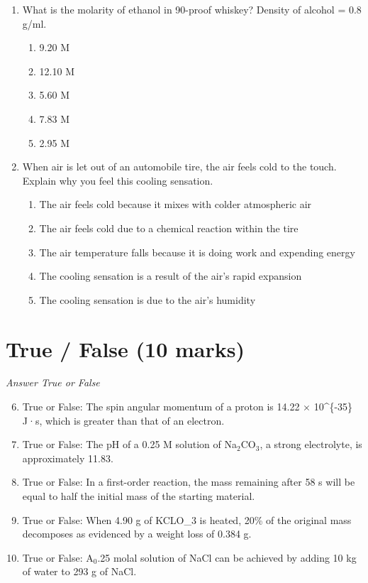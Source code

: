 \documentclass[12pt]{article}
\begin{document}
\begin{enumerate}[label=\arabic*.]
\item What is the molarity of ethanol in 90-proof whiskey? Density of alcohol = 0.8 g/ml.
\begin{enumerate}[label=(\alph*)]
    \item 9.20 M
    \item 12.10 M
    \item 5.60 M
    \item 7.83 M
    \item 2.95 M
\end{enumerate}
\item When air is let out of an automobile tire, the air feels cold to the touch. Explain why you feel this cooling sensation.
\begin{enumerate}[label=(\alph*)]
    \item The air feels cold because it mixes with colder atmospheric air
    \item The air feels cold due to a chemical reaction within the tire
    \item The air temperature falls because it is doing work and expending energy
    \item The cooling sensation is a result of the air's rapid expansion
    \item The cooling sensation is due to the air's humidity
\end{enumerate}
\end{enumerate}

\section*{True / False (10 marks)}
\textit{Answer True or False}
\begin{enumerate}[label=\arabic*.]
\setcounter{enumi}{5}
\item True or False: The spin angular momentum of a proton is 14.22 \ensuremath{\times} 10^\{-35\} J·s, which is greater than that of an electron.
\item True or False: The pH of a 0.25 M solution of Na$_{2}$CO$_{3}$, a strong electrolyte, is approximately 11.83.
\item True or False: In a first-order reaction, the mass remaining after 58 s will be equal to half the initial mass of the starting material.
\item True or False: When 4.90 g of KCLO\_3 is heated, 20\% of the original mass decomposes as evidenced by a weight loss of 0.384 g.
\item True or False: A$_{0}$.25 molal solution of NaCl can be achieved by adding 10 kg of water to 293 g of NaCl.
\end{enumerate}
\end{document}

